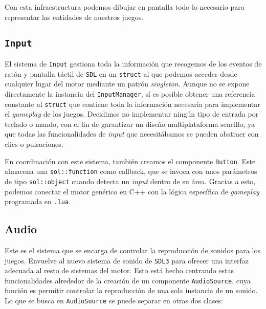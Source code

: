 Con esta infraestructura podemos dibujar en pantalla todo lo necesario para representar las entidades de nuestros juegos. 

\subsection{\texttt{Input}}
El sistema de \texttt{Input} gestiona toda la información que recogemos de los eventos de ratón y pantalla táctil de \texttt{SDL} en un \texttt{struct} al que podemos acceder desde cualquier lugar del motor mediante un patrón \textit{singleton}. Aunque no se expone directamente la instancia del \texttt{InputManager}, sí es posible obtener una referencia constante al \texttt{struct} que contiene toda la información necesaria para implementar el \textit{gameplay} de los juegos. Decidimos no implementar ningún tipo de entrada por teclado o mando, con el fin de garantizar un diseño multiplataforma sencillo, ya que todas las funcionalidades de \textit{input} que necesitábamos se pueden abstraer con clics o pulsaciones. 

\medskip

En coordinación con este sistema, también creamos el componente \texttt{Button}. Este almacena una \texttt{sol::function} como callback, que se invoca con unos parámetros de tipo \texttt{sol::object} cuando detecta un \textit{input} dentro de su área. Gracias a esto, podemos conectar el motor genérico en C++ con la lógica específica de \textit{gameplay} programada en \texttt{.lua}. 

\subsection{Audio}
Este es el sistema que se encarga de controlar la reproducción de sonidos para los juegos. Envuelve al nuevo sistema de sonido de \texttt{SDL3} para ofrecer una interfaz adecuada al resto de sistemas del motor. Esto está hecho centrando estas funcionalidades alrededor de la creación de un componente \texttt{AudioSource}, cuya función es permitir controlar la reproducción de una sola instancia de un sonido. Lo que se busca en \texttt{AudioSource} se puede separar en otras dos clases:

